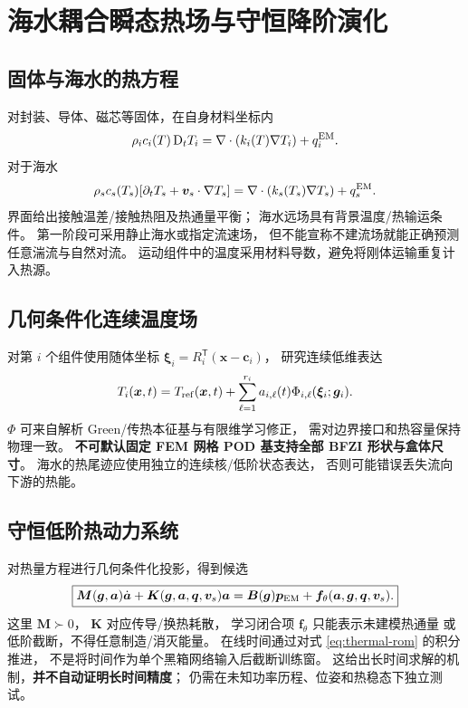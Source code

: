 \section{海水耦合瞬态热场与守恒降阶演化}\label{sec:thermal}
\subsection{固体与海水的热方程}
对封装、导体、磁芯等固体，在自身材料坐标内
\begin{equation}
\rho_i c_i(T)\,\mathrm D_t T_i
=\nabla\cdot(k_i(T)\nabla T_i)+q_i^{\rm EM}.
\label{eq:heat-solid}
\end{equation}
对于海水
\begin{equation}
\rho_sc_s(T_s)[\partial_tT_s+\bm v_s\cdot\nabla T_s]
=\nabla\cdot(k_s(T_s)\nabla T_s)+q_s^{\rm EM}.
\label{eq:heat-sea}
\end{equation}
界面给出接触温差/接触热阻及热通量平衡；
海水远场具有背景温度/热输运条件。
第一阶段可采用静止海水或指定流速场，
但不能宣称不建流场就能正确预测任意湍流与自然对流。
运动组件中的温度采用材料导数，避免将刚体运输重复计入热源。

\subsection{几何条件化连续温度场}
对第 \(i\) 个组件使用随体坐标
\(\bm\xi_i=R_i^{\mathsf T}(\bm x-\bm c_i)\)，
研究连续低维表达
\begin{equation}
T_i(\bm x,t)=T_{\rm ref}(\bm x,t)
+\sum_{\ell=1}^{r_i}
a_{i,\ell}(t)\Phi_{i,\ell}(\bm\xi_i;\bm g_i).
\label{eq:thermal-basis}
\end{equation}
\(\Phi\) 可来自解析 Green/传热本征基与有限维学习修正，
需对边界接口和热容量保持物理一致。
\textbf{不可默认固定 FEM 网格 POD 基支持全部 BFZI 形状与盒体尺寸}。
海水的热尾迹应使用独立的连续核/低阶状态表达，
否则可能错误丢失流向下游的热能。

\subsection{守恒低阶热动力系统}
对热量方程进行几何条件化投影，得到候选
\begin{equation}
\boxed{
\bm M(\bm g,\bm a)\dot{\bm a}
+\bm K(\bm g,\bm a,\bm q,\bm v_s)\bm a
=\bm B(\bm g)\bm p_{\rm EM}
+\bm f_\theta(\bm a,\bm g,\bm q,\bm v_s).
}
\label{eq:thermal-rom}
\end{equation}
这里 \(\bm M\succ0\)，
\(\bm K\) 对应传导/换热耗散，
学习闭合项 \(\bm f_\theta\) 只能表示未建模热通量
或低阶截断，不得任意制造/消灭能量。
在线时间通过对式 \eqref{eq:thermal-rom} 的积分推进，
不是将时间作为单个黑箱网络输入后截断训练窗。
这给出长时间求解的机制，\textbf{并不自动证明长时间精度}；
仍需在未知功率历程、位姿和热稳态下独立测试。
